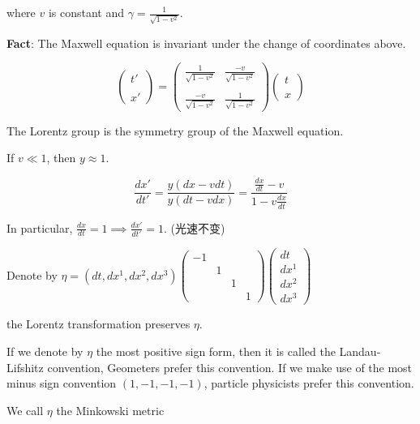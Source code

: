 where \(v\) is constant and \(\gamma = \frac{1}{\sqrt{1-v^2}}\).



\textbf{Fact}: The Maxwell equation is invariant under the change of coordinates above.

\[\begin{pmatrix}
t' \\ \\
x'
\end{pmatrix} =
\begin{pmatrix}
\frac{1}{\sqrt{1-v^2}} & \frac{-v}{\sqrt{1-v^2}} \\ \\
\frac{-v}{\sqrt{1-v^2}} & \frac{1}{\sqrt{1-v^2}}
\end{pmatrix}
\begin{pmatrix}
t \\ \\
x
\end{pmatrix}\]

The Lorentz group is the symmetry group of the Maxwell equation.

If \(v \ll 1\), then \(y \approx 1\).

\[\frac{dx'}{dt'} = \frac{y(dx - vdt)}{y(dt - vdx)} = \frac{\frac{dx}{dt} - v}{1 - v \frac{dx}{dt}}\]

In particular, \(\frac{dx}{dt} = 1 \implies \frac{dx'}{dt'} = 1\). (光速不变)

Denote by $\eta=(dt, dx^1, dx^2, dx^3)\begin{pmatrix}
    -1&&&\\
    &1&&\\
    &&1&\\
    &&&1
\end{pmatrix}\begin{pmatrix}
    dt\\dx^1\\dx^2\\dx^3
\end{pmatrix}$

the Lorentz transformation preserves \(\eta\).


\begin{remark}
    If we denote by \( \eta \) the most positive sign form, then it is called the Landau-Lifshitz convention, Geometers prefer this convention.
If we make use of the most minus sign convention $(1, -1, -1, -1)$, particle physicists prefer this convention.
\end{remark}
 

We call \( \eta \) the Minkowski metric

